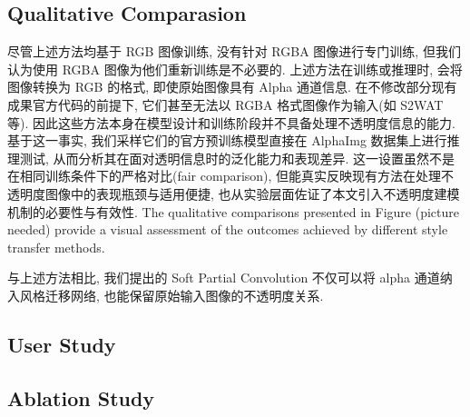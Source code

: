 
\subsection{Qualitative Comparasion}

尽管上述方法均基于 RGB 图像训练, 没有针对 RGBA 图像进行专门训练, 但我们认为使用 RGBA 图像为他们重新训练是不必要的. 上述方法在训练或推理时, 会将图像转换为 RGB 的格式, 即使原始图像具有 Alpha 通道信息. 在不修改部分现有成果官方代码的前提下, 它们甚至无法以 RGBA 格式图像作为输入(如 S2WAT 等). 因此这些方法本身在模型设计和训练阶段并不具备处理不透明度信息的能力. 基于这一事实, 我们采样它们的官方预训练模型直接在 AlphaImg 数据集上进行推理测试, 从而分析其在面对透明信息时的泛化能力和表现差异. 这一设置虽然不是在相同训练条件下的严格对比(fair comparison), 但能真实反映现有方法在处理不透明度图像中的表现瓶颈与适用便捷, 也从实验层面佐证了本文引入不透明度建模机制的必要性与有效性. The qualitative comparisons presented in Figure (picture needed) provide a visual assessment of the outcomes achieved by different style transfer methods.



与上述方法相比, 我们提出的 Soft Partial Convolution 不仅可以将 alpha 通道纳入风格迁移网络, 也能保留原始输入图像的不透明度关系.
\subsection{User Study}


\subsection{Ablation Study}